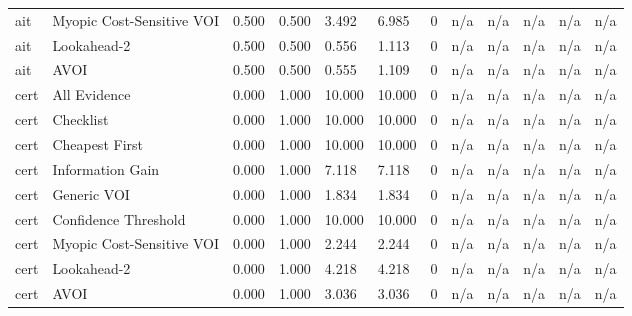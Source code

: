 \begin{table}[!ht]
{\begin{tabular}{llllllllllll}
ait & Myopic Cost-Sensitive VOI & 0.500 & 0.500 & 3.492 & 6.985 & 0 & n/a & n/a & n/a & n/a & n/a \\
ait & Lookahead-2 & 0.500 & 0.500 & 0.556 & 1.113 & 0 & n/a & n/a & n/a & n/a & n/a \\
ait & AVOI & 0.500 & 0.500 & 0.555 & 1.109 & 0 & n/a & n/a & n/a & n/a & n/a \\
cert & All Evidence & 0.000 & 1.000 & 10.000 & 10.000 & 0 & n/a & n/a & n/a & n/a & n/a \\
cert & Checklist & 0.000 & 1.000 & 10.000 & 10.000 & 0 & n/a & n/a & n/a & n/a & n/a \\
cert & Cheapest First & 0.000 & 1.000 & 10.000 & 10.000 & 0 & n/a & n/a & n/a & n/a & n/a \\
cert & Information Gain & 0.000 & 1.000 & 7.118 & 7.118 & 0 & n/a & n/a & n/a & n/a & n/a \\
cert & Generic VOI & 0.000 & 1.000 & 1.834 & 1.834 & 0 & n/a & n/a & n/a & n/a & n/a \\
cert & Confidence Threshold & 0.000 & 1.000 & 10.000 & 10.000 & 0 & n/a & n/a & n/a & n/a & n/a \\
cert & Myopic Cost-Sensitive VOI & 0.000 & 1.000 & 2.244 & 2.244 & 0 & n/a & n/a & n/a & n/a & n/a \\
cert & Lookahead-2 & 0.000 & 1.000 & 4.218 & 4.218 & 0 & n/a & n/a & n/a & n/a & n/a \\
cert & AVOI & 0.000 & 1.000 & 3.036 & 3.036 & 0 & n/a & n/a & n/a & n/a & n/a \\
\bottomrule
\end{tabular}}
\end{table}
